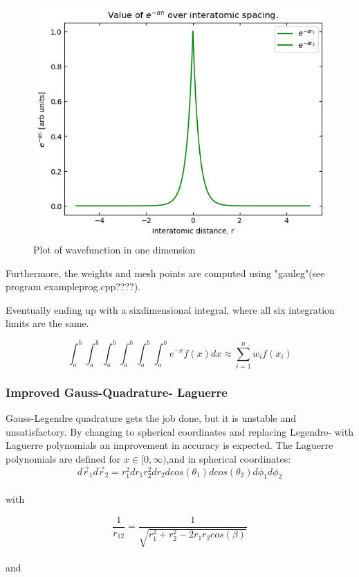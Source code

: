 \documentclass[../main.tex]{subfiles}
\begin{document}
\begin{figure}
  \includegraphics{../imag/expfunc_plot.png}
  \caption{Plot of wavefunction in one dimension}
  \label{fig:plot}
\end{figure}

Furthermore, the  weights and mesh points are computed using "gauleg"(see program exampleprog.cpp????).

Eventually ending up with a sixdimensional integral, where all six integration limits are the same.

\[\int_a^b\int_a^b\int_a^b\int_a^b\int_a^b\int_a^b e^{-x}f(x)dx \approx \sum_{i=1}^n w_i f(x_i)\]

\subsubsection{Improved Gauss-Quadrature- Laguerre} \label{sec:improved_GQ}
Gauss-Legendre quadrature gets the job done, but it is unstable and unsatisfactory. By changing to spherical coordinates and  replacing Legendre- with Laguerre polynomials an improvement in accuracy is expected. The Laguerre polynomials are defined for  $x \in [0, \infty)$,and in spherical coordinates:
\\

\[ d\vec{r}_1 d\vec{r}_2 = r_1^2 dr_1 r_2^2 dr_2 dcos(\theta_1) dcos(\theta_2) d\phi_1 d\phi_2\]
\\
with

\[\frac{1}{r_{12}} = \frac{1}{\sqrt{r_1^2 + r_2^2 - 2r_1r_2cos(\beta)}} \]
\\and
\end{document}
